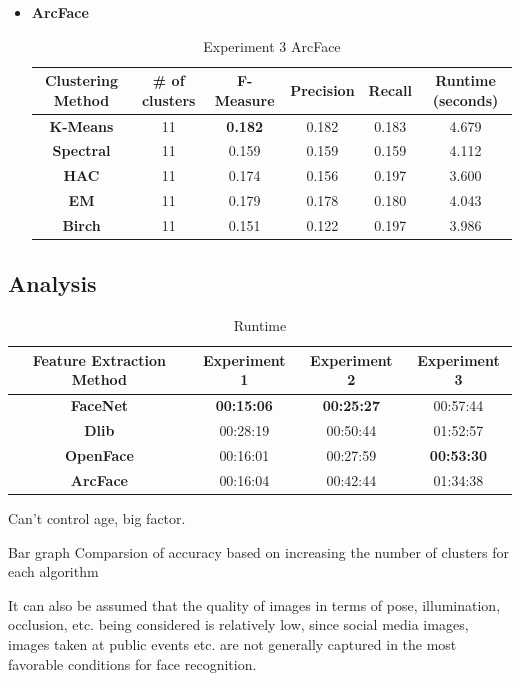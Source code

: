 \documentclass[12pt,english]{article}
\begin{document}
\begin{itemize}
\item \textbf{ArcFace}
\begin{table}[H]
\centering
\begin{tabular}{||c c c c c c||} 
 \hline
 Clustering Method & \# of clusters & F-Measure & Precision & Recall & Runtime (seconds)\\ [0.5ex]
 \hline\hline
 \textbf{K-Means} & 11 & \textbf{0.182} & 0.182 & 0.183 & 4.679\\ 
 \hline
  \textbf{Spectral} & 11 & 0.159 & 0.159 & 0.159 & 4.112\\
 \hline
 \textbf{HAC} & 11 & 0.174 & 0.156 & 0.197 & 3.600\\
 \hline
 \textbf{EM} & 11 & 0.179 & 0.178 & 0.180 & 4.043\\
 \hline
 \textbf{Birch} & 11 & 0.151 & 0.122 & 0.197 & 3.986\\
 \hline
\end{tabular}
\caption{Experiment 3 ArcFace}
\label{table:ex3arcface}
\end{table}

\end{itemize}

\subsection{Analysis}

\begin{table}[h!]
\centering
\begin{tabular}{||c c c c||} 
 \hline
Feature Extraction Method & Experiment 1 & Experiment 2 & Experiment 3\\ [0.5ex]
 \hline\hline
 \textbf{FaceNet} & \textbf{00:15:06} & \textbf{00:25:27} & 00:57:44\\ 
 \hline
  \textbf{Dlib} & 00:28:19 & 00:50:44 & 01:52:57\\
 \hline
 \textbf{OpenFace} & 00:16:01 & 00:27:59 & \textbf{00:53:30}\\
 \hline
 \textbf{ArcFace} & 00:16:04 & 00:42:44 & 01:34:38\\
 \hline
\end{tabular}
\caption{Runtime}
\label{table:runtime}
\end{table}

Can't control age, big factor.

Bar graph Comparsion of accuracy based on increasing the number of clusters for each algorithm


It can also be assumed that the quality of images in terms of pose, illumination, occlusion, etc. being considered is relatively low, since social media images, images taken at public events etc. are not generally captured in the most favorable conditions for face recognition. \cite{shi}
\end{document}
